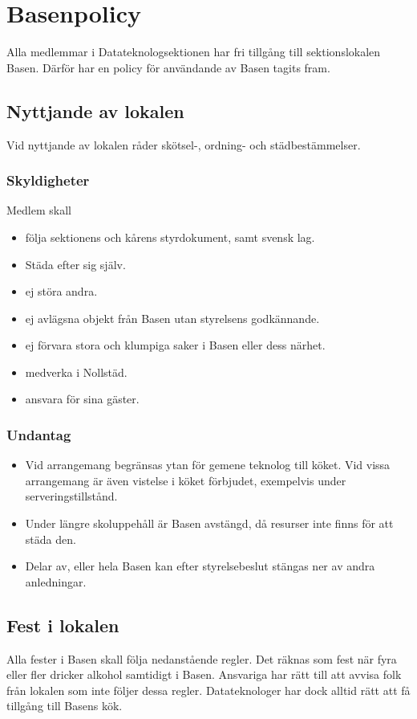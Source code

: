 \section{Basenpolicy}
Alla medlemmar i Datateknologsektionen har fri tillgång till sektionslokalen Basen. Därför har en policy för användande av Basen tagits fram.

\subsection{Nyttjande av lokalen}
Vid nyttjande av lokalen råder skötsel-, ordning- och städbestämmelser.

\subsubsection{Skyldigheter}
Medlem skall
\begin{itemize}
    \item följa sektionens och kårens styrdokument, samt svensk lag.
    \item Städa efter sig själv.
    \item ej störa andra.
    \item ej avlägsna objekt från Basen utan styrelsens godkännande.
    \item ej förvara stora och klumpiga saker i Basen eller dess närhet.
    \item medverka i Nollstäd.
    \item ansvara för sina gäster.
\end{itemize}

\subsubsection{Undantag}
\begin{itemize}
    \item Vid arrangemang begränsas ytan för gemene teknolog till köket. Vid vissa arrangemang är även vistelse i köket förbjudet, exempelvis under serveringstillstånd.
    \item Under längre skoluppehåll är Basen avstängd, då resurser inte finns för att städa den.
    \item Delar av, eller hela Basen kan efter styrelsebeslut stängas ner av andra anledningar.
\end{itemize}

\subsection{Fest i lokalen}
Alla fester i Basen skall följa nedanstående regler. Det räknas som fest när fyra eller fler dricker alkohol samtidigt i Basen. Ansvariga har rätt till att avvisa folk från lokalen som inte följer dessa regler. Datateknologer har dock alltid rätt att få tillgång till Basens kök.
